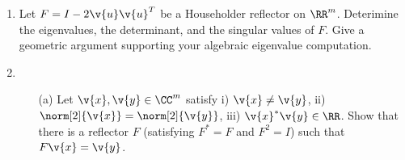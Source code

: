 \documentclass[11pt]{article}
\begin{document}
\begin{enumerate}
    \item %
        Let $F = I - 2\v{u}\v{u}^T$ be a Householder reflector on $\RR^m$.
        Deterimine the eigenvalues, the determinant, and the singular values of
        $F$.
        Give a geometric argument supporting your algebraic eigenvalue
        computation.

    \item %
        \begin{enumerate}
            \item[(a)] %
                Let $\v{x}, \v{y} \in \CC^m$ satisfy i) $\v{x} \neq \v{y}$, ii)
                $\norm[2]{\v{x}} = \norm[2]{\v{y}}$, iii)
                $\v{x}^* \v{y} \in \RR$.
                Show that there is a reflector $F$ (satisfying $F^* = F$ and $F^2 = I$)
                such that $F\v{x} = \v{y}$.


\end{enumerate}
\end{enumerate}
\end{document}
